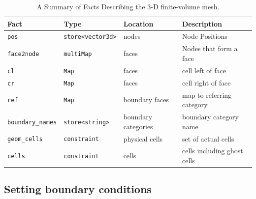 \documentclass[10pt,epsf,letterpaper,twoside]{book}
\begin{document}
\begin{table}[htbp]
\label{fvmfacts}
\caption{ A Summary of Facts Describing the 3-D finite-volume mesh.}
\begin{center}
  \begin{tabular}{|l|l|l|l|}
    \hline
    Fact  & Type & Location & Description\\
    \hline\hline
    {\tt pos} & {\tt store<vector3d>} & nodes & Node Positions\\
    {\tt face2node} & {\tt multiMap} & faces & Nodes that form a
    face\\
    {\tt cl} & {\tt Map} & faces & cell left of face\\
    {\tt cr} & {\tt Map} & faces & cell right of face\\
    {\tt ref} & {\tt Map} & boundary faces & map to referring category\\
    {\tt boundary\_names} & {\tt store<string>} & boundary categories & boundary category name\\
    {\tt geom\_cells} & {\tt constraint} & physical cells & set of actual cells\\
{\tt cells} & {\tt constraint} & cells & cells including ghost cells\\
    \hline
  \end{tabular}
\end{center}
\end{table}

\subsection{ Setting boundary conditions}
\end{document}
